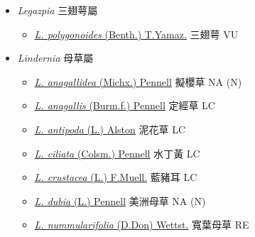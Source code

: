 
  \begin{itemize}
 \item[] \textit{Legazpia} 三翅萼屬
                                
  \begin{itemize}
        \item[] \href{http://www.theplantlist.org/tpl1.1/search?q=Legazpia+polygonoides}{\textit{L. polygonoides} (Benth.) T.Yamaz.}   三翅萼   VU
  \end{itemize}
 \item[] \textit{Lindernia} 母草屬
                                
  \begin{itemize}
        \item[] \href{http://www.theplantlist.org/tpl1.1/search?q=Lindernia+anagallidea}{\textit{L. anagallidea} (Michx.) Pennell}   擬櫻草   NA (N)
        \item[] \href{http://www.theplantlist.org/tpl1.1/search?q=Lindernia+anagallis}{\textit{L. anagallis} (Burm.f.) Pennell}   定經草   LC
        \item[] \href{http://www.theplantlist.org/tpl1.1/search?q=Lindernia+antipoda}{\textit{L. antipoda} (L.) Alston}   泥花草   LC
        \item[] \href{http://www.theplantlist.org/tpl1.1/search?q=Lindernia+ciliata}{\textit{L. ciliata} (Colsm.) Pennell}   水丁黃   LC
        \item[] \href{http://www.theplantlist.org/tpl1.1/search?q=Lindernia+crustacea}{\textit{L. crustacea} (L.) F.Muell.}   藍豬耳   LC
        \item[] \href{http://www.theplantlist.org/tpl1.1/search?q=Lindernia+dubia}{\textit{L. dubia} (L.) Pennell}   美洲母草   NA (N)
        \item[] \href{http://www.theplantlist.org/tpl1.1/search?q=Lindernia+nummularifolia}{\textit{L. nummularifolia} (D.Don) Wettst.}   寬葉母草   RE

\end{itemize}
\end{itemize}
